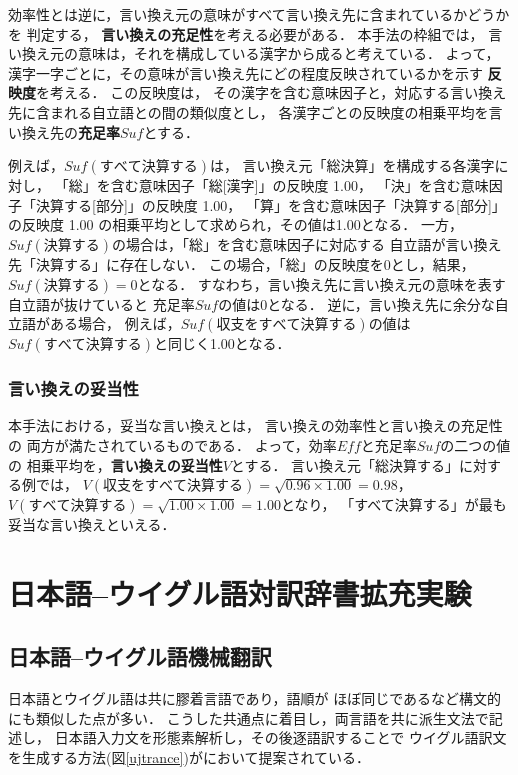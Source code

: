 効率性とは逆に，言い換え元の意味がすべて言い換え先に含まれているかどうかを
判定する，
{\bf 言い換えの充足性}を考える必要がある．
本手法の枠組では，
言い換え元の意味は，それを構成している漢字から成ると考えている．
よって，漢字一字ごとに，その意味が言い換え先にどの程度反映されているかを示す
{\bf 反映度}を考える．
この反映度は，
その漢字を含む意味因子と，対応する言い換え先に含まれる自立語との間の類似度とし，
各漢字ごとの反映度の相乗平均を言い換え先の{\bf 充足率}$Suf$とする．

例えば，$Suf(すべて決算する)$は，
言い換え元「総決算」を構成する各漢字に対し，
「総」を含む意味因子「総[漢字]」の反映度 1.00，
「決」を含む意味因子「決算する[部分]」の反映度 1.00，
「算」を含む意味因子「決算する[部分]」の反映度 1.00
の相乗平均として求められ，その値は1.00となる．
一方，$Suf(決算する)$の場合は，「総」を含む意味因子に対応する
自立語が言い換え先「決算する」に存在しない．
この場合，「総」の反映度を0とし，結果，$Suf(決算する) = 0$となる．
すなわち，言い換え先に言い換え元の意味を表す自立語が抜けていると
充足率$Suf$の値は0となる．
逆に，言い換え先に余分な自立語がある場合，
例えば，$Suf(収支をすべて決算する)$の値は$Suf(すべて決算する)$と同じく1.00となる．

  \subsubsection{言い換えの妥当性}

本手法における，妥当な言い換えとは，
言い換えの効率性と言い換えの充足性の
両方が満たされているものである．
よって，効率$Eff$と充足率$Suf$の二つの値の
相乗平均を，{\bf 言い換えの妥当性}$V$とする．
言い換え元「総決算する」に対する例では，
$V(収支をすべて決算する) = \sqrt{0.96\times 1.00} = 0.98$，
$V(すべて決算する) = \sqrt{1.00\times 1.00} = 1.00$となり，
「すべて決算する」が最も妥当な言い換えといえる．

\section{日本語--ウイグル語対訳辞書拡充実験}
 \subsection{日本語--ウイグル語機械翻訳}
 日本語とウイグル語は共に膠着言語であり，語順が
ほぼ同じであるなど構文的にも類似した点が多い．
こうした共通点に着目し，両言語を共に派生文法\cite{kiyose}で記述し，
日本語入力文を形態素解析し，その後逐語訳することで
ウイグル語訳文を生成する方法(図\ref{ujtrance})が\cite{ogawa}において提案されている．

